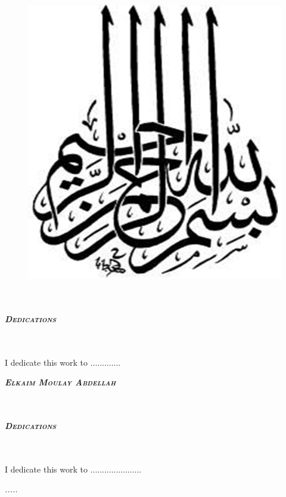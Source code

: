 \documentclass[english,a4,12pt]{report}
\begin{document}
    \thispagestyle{empty}
    \begin{figure}[h]
    	\centering
    		\includegraphics[width=14cm]{figurs/B.PNG}
    \end{figure}
    \newpage
    \thispagestyle{empty}
    \clearpage
    \newpage
    \begin{center}
        \textbf{\\}
        \textbf{\\}
        \textbf{\huge \textsc{\itshape Dedications}}\\
        \textbf{\\}
        \textbf{\\}
        \begin{flushleft}
            \textsf{\qquad I dedicate this work to ............. }\\
        \end{flushleft}
    \end{center}
    \begin{flushright}
        \textbf{\textsc{\itshape Elkaim Moulay Abdellah}}
    \end{flushright}
    \newpage
    \begin{center}
        \textbf{\\}
        \textbf{\\}
        \textbf{\huge \textsc{\itshape Dedications}}\\
        \textbf{\\}
        \textbf{\\}

        \begin{flushleft}
            \textsf{\qquad I dedicate this work to ...................... }
        \end{flushleft}

        \normalsize{\itshape .....}
        \textbf{\\}
        \textbf{\\}
    \end{center}
\end{document}
